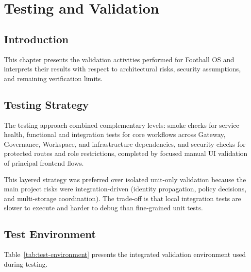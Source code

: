 \chapter{Testing and Validation}

\section*{Introduction}

This chapter presents the validation activities performed for Football OS and
interprets their results with respect to architectural risks, security
assumptions, and remaining verification limits.

\section{Testing Strategy}

The testing approach combined complementary levels: smoke checks for service
health, functional and integration tests for core workflows across Gateway,
Governance, Workspace, and infrastructure dependencies, and security checks for
protected routes and role restrictions, completed by focused manual UI
validation of principal frontend flows.

This layered strategy was preferred over isolated unit-only validation because
the main project risks were integration-driven (identity propagation, policy
decisions, and multi-storage coordination). The trade-off is that local
integration tests are slower to execute and harder to debug than fine-grained
unit tests.

\section{Test Environment}

Table~\ref{tab:test-environment} presents the integrated validation
environment used during testing.

